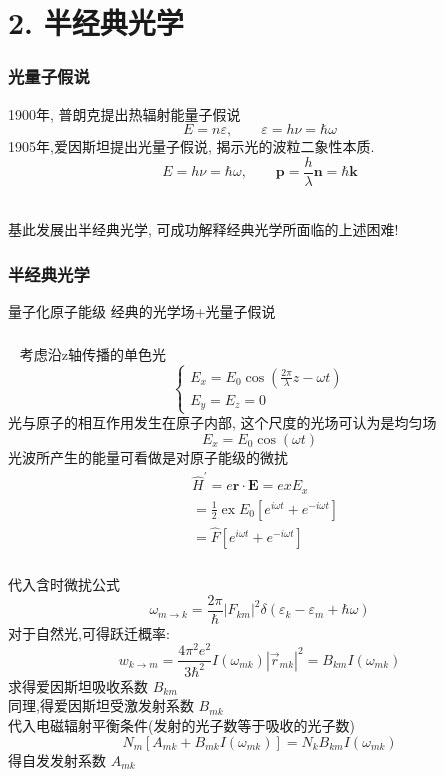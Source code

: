 \section{2. 半经典光学}

\begin{frame}
      \frametitle{光量子假说}
      1900年, 普朗克提出热辐射能量子假说
      \[E= n \varepsilon , \qquad \varepsilon= h \nu= \hbar \omega\]
      1905年,爱因斯坦提出光量子假说, 揭示光的波粒二象性本质.  \\ {\vspace*{1em}}
      \[E= h \nu= \hbar \omega, \qquad  \mathbf{p}=\frac{h}{\lambda} \mathbf{n} = \hbar \mathbf{k} \]  
      \\  \vspace*{3em}

      基此发展出半经典光学, 可成功解释经典光学所面临的上述困难!
\end{frame}

\begin{frame}
    \frametitle{半经典光学}     
    \begin{itemize}
        \Item 量子化原子能级
        \Item 经典的光学场+光量子假说
    \end{itemize}  
\end{frame}

\begin{frame}
      \frametitle{}
      \例 [2. 试采用半经典方法处理光与原子的相互作用问题] {}
      \解~ 考虑沿z轴传播的单色光 
      \[ \left\{\begin{array}{l}
        E_{x}=E_{0} \cos \left(\frac{2 \pi}{\lambda} z-\omega t\right) \\
        E_{y}=E_{z}=0
        \end{array}\right. \]
     光与原子的相互作用发生在原子内部, 这个尺度的光场可认为是均匀场
     \[E_{x}=E_{0} \cos \left(\omega t\right)  \]
     光波所产生的能量可看做是对原子能级的微扰 
     \[\begin{aligned}
        &\hat{H}^{\prime}=e\mathbf{r}\cdot\mathbf{E}  = ex E_{x} \\
        &=\frac{1}{2} \operatorname{ex} E_{0}\left[e^{i \omega t}+e^{-i \omega t}\right] \\
        &=\hat{F}\left[e^{i \omega t}+e^{-i \omega t}\right]
        \end{aligned}
      \]
\end{frame}

\begin{frame}
      \frametitle{}
      代入含时微扰公式
      \[ \omega_{m \rightarrow k}=\frac{2 \pi}{\hbar}\left|F_{k m}\right|^{2} \delta\left(\varepsilon_{k}-\varepsilon_{m}+\hbar \omega\right) \]
      对于自然光,可得跃迁概率:
      \[ w_{k \rightarrow m}=\frac{4 \pi^{2} e^{2}}{3 \hbar^{2}} I\left(\omega_{m k}\right)\left|\vec{r}_{m k}\right|^{2} = B_{km} I\left(\omega_{m k}\right)\]
      求得爱因斯坦吸收系数 $B_{km}$ \\ 
      同理,得爱因斯坦受激发射系数 $B_{mk}$  \\ 
      代入电磁辐射平衡条件(发射的光子数等于吸收的光子数) 
      \[N_{m}\left[A_{m k}+B_{m k} I\left(\omega_{m k}\right)\right]=N_{k} B_{k m} I\left(\omega_{m k}\right) \]
      得自发发射系数 $A_{mk}$ 
\end{frame}

